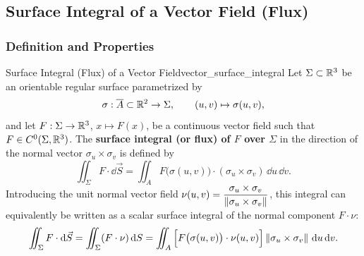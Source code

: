 \subsection{Surface Integral of a Vector Field (Flux)}

\subsubsection{Definition and Properties}

\begin{definition}{Surface Integral (Flux) of a Vector Field}{vector_surface_integral}
Let $\Sigma \subset \mathbb{R}^3$ be an orientable regular surface parametrized by
\[
    \sigma : \overline{A} \subset \mathbb{R}^2 \to \Sigma, \qquad (u,v) \mapsto \sigma(u,v),
\]
and let $F : \Sigma \to \mathbb{R}^3$, $x \mapsto F(x)$, be a continuous vector field such that $F \in C^0(\Sigma, \mathbb{R}^3)$. The \textbf{surface integral (or flux) of $F$ over $\Sigma$} in the direction of the normal vector $\sigma_u \times \sigma_v$ is defined by
\[
    \iint_{\Sigma} F \cdot \dd\vec{S} = \iint_{A} F\big(\sigma(u,v)\big) \cdot (\sigma_u \times \sigma_v) \,\dd u\,\dd v.
\]
Introducing the unit normal vector field $\nu(u,v) = \dfrac{\sigma_u \times \sigma_v}{\left\lVert\sigma_u \times \sigma_v\right\rVert}$, this integral can equivalently be written as a scalar surface integral of the normal component $F \cdot \nu$:
\[
    \iint_{\Sigma} F \cdot \mathrm{d}\vec{S} = \iint_{\Sigma} (F \cdot \nu) \,\mathrm{d}S = \iint_{A} \Big[ F\big(\sigma(u,v)\big) \cdot \nu(u,v) \Big] \left\lVert\sigma_u \times \sigma_v\right\rVert \,\mathrm{d} u\,\mathrm{d} v.
\]
\end{definition}

